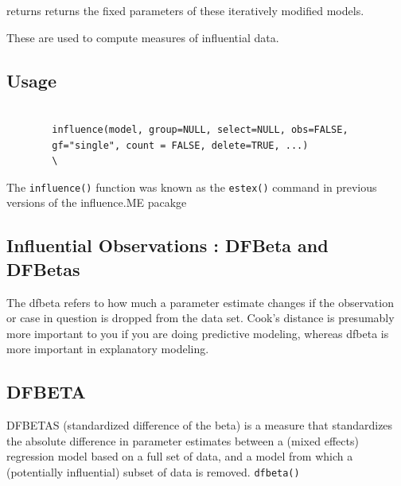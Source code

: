\documentclass[Main.tex]{subfiles}
\begin{document}
	returns returns the fixed parameters of these iteratively modified models. 
	
	These are used to compute measures of influential data.
	
	
	
	
	\subsection*{Usage}
	\begin{framed}
		\begin{verbatim}
		
		influence(model, group=NULL, select=NULL, obs=FALSE, 
		gf="single", count = FALSE, delete=TRUE, ...)
		\
		\end{verbatim}
	\end{framed}
	
	
	The \texttt{influence()} function was known as the \texttt{estex()} command in previous versions of the influence.ME pacakge

	
	
	
	
	

	\subsection{Influential Observations : DFBeta and DFBetas}
	The dfbeta refers to how much a parameter estimate changes if the observation or case in question is dropped from the data set.  Cook's distance is presumably more important to you if you are doing predictive modeling, whereas dfbeta is more important in explanatory modeling.
	\subsection{DFBETA} %
	DFBETAS (standardized difference of the beta) is a measure that standardizes the absolute difference in parameter estimates between a (mixed effects) regression model based on a full set of data, and a model from which a (potentially influential) subset of data is removed.
		\texttt{dfbeta()}
		
\end{document}
